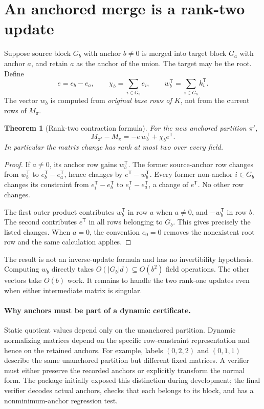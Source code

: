 \documentclass[11pt,letterpaper]{article}
\newtheorem{theorem}{Theorem}[section]
\theoremstyle{definition}\newtheorem{definition}[theorem]{Definition}
\theoremstyle{remark}\newtheorem{remark}[theorem]{Remark}
\newcommand{\trans}{^{\mathsf T}}
\begin{document}
\section{An anchored merge is a rank-two update}
\label{sec:merge}

Suppose source block $G_b$ with anchor $b\neq0$ is merged into target block $G_a$ with anchor $a$, and retain $a$ as the anchor of the union. The target may be the root. Define
\[
 e=e_b-e_a,\qquad
 \chi_b=\sum_{i\in G_b}e_i,\qquad
 w_b\trans=\sum_{i\in G_b}k_i\trans.
\]
The vector $w_b$ is computed from \emph{original base rows of $K$}, not from the current rows of $M_\pi$.

\begin{theorem}[Rank-two contraction formula]
\label{thm:merge}
For the new anchored partition $\pi'$,
\begin{equation}
 M_{\pi'}-M_\pi=-e\,w_b\trans+\chi_b e\trans.
 \label{eq:ranktwo}
\end{equation}
In particular the matrix change has rank at most two over every field.
\end{theorem}
\begin{proof}
If $a\neq0$, its anchor row gains $w_b\trans$. The former source-anchor row changes from $w_b\trans$ to $e_b\trans-e_a\trans$, hence changes by $e\trans-w_b\trans$. Every former non-anchor $i\in G_b$ changes its constraint from $e_i\trans-e_b\trans$ to $e_i\trans-e_a\trans$, a change of $e\trans$. No other row changes.

The first outer product contributes $w_b\trans$ in row $a$ when $a\neq0$, and $-w_b\trans$ in row $b$. The second contributes $e\trans$ in all rows belonging to $G_b$. This gives precisely the listed changes. When $a=0$, the convention $e_0=0$ removes the nonexistent root row and the same calculation applies.
\end{proof}

The result is not an inverse-update formula and has no invertibility hypothesis. Computing $w_b$ directly takes $O(|G_b|d)\subseteq O(b^2)$ field operations. The other vectors take $O(b)$ work. It remains to handle the two rank-one updates even when either intermediate matrix is singular.

\paragraph{Why anchors must be part of a dynamic certificate.}
Static quotient values depend only on the unanchored partition. Dynamic normalizing matrices depend on the specific row-constraint representation and hence on the retained anchors. For example, labels $(0,2,2)$ and $(0,1,1)$ describe the same unanchored partition but different fixed matrices. A verifier must either preserve the recorded anchors or explicitly transform the normal form. The package initially exposed this distinction during development; the final verifier decodes actual anchors, checks that each belongs to its block, and has a nonminimum-anchor regression test.
\end{document}
